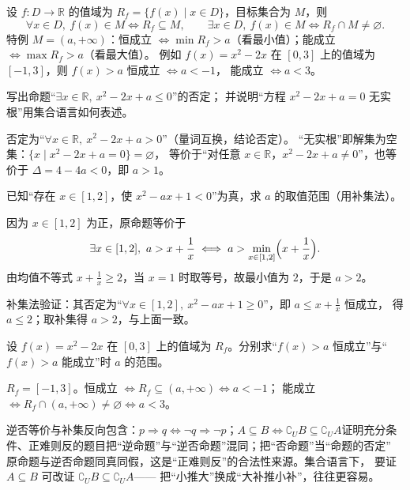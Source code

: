 \begin{explore}
设 $f:D\to\mathbb{R}$ 的值域为 $R_f=\{f(x)\mid x\in D\}$，目标集合为 $M$，则
\[
  \forall x\in D,\ f(x)\in M \iff R_f\subseteq M,\qquad
  \exists x\in D,\ f(x)\in M \iff R_f\cap M\neq\varnothing.
\]
特例 $M=(a,+\infty)$：恒成立 $\iff\min R_f>a$（看最小值）；能成立 $\iff\max R_f>a$（看最大值）。
例如 $f(x)=x^2-2x$ 在 $[0,3]$ 上的值域为 $[-1,3]$，则 $f(x)>a$ 恒成立 $\iff a<-1$，
能成立 $\iff a<3$。

\begin{example}
写出命题“$\exists x\in\mathbb{R},\ x^2-2x+a\leq0$”的否定；
并说明“方程 $x^2-2x+a=0$ 无实根”用集合语言如何表述。
\end{example}
\begin{solution}
否定为“$\forall x\in\mathbb{R},\ x^2-2x+a>0$”（量词互换，结论否定）。
“无实根”即解集为空集：$\{x\mid x^2-2x+a=0\}=\varnothing$，
等价于“对任意 $x\in\mathbb{R}$，$x^2-2x+a\neq0$”，也等价于 $\Delta=4-4a<0$，即 $a>1$。
\end{solution}

\begin{example}
已知“存在 $x\in[1,2]$，使 $x^2-ax+1<0$”为真，求 $a$ 的取值范围（用补集法）。
\end{example}
\begin{solution}
因为 $x\in[1,2]$ 为正，原命题等价于
\[
  \exists x\in[1,2],\ a>x+\frac1x
  \iff a>\min_{x\in[1,2]}\Bigl(x+\frac1x\Bigr).
\]
由均值不等式 $x+\frac1x\geq2$，当 $x=1$ 时取等号，故最小值为 $2$，于是 $a>2$。

补集法验证：其否定为“$\forall x\in[1,2],\ x^2-ax+1\geq0$”，即 $a\leq x+\frac1x$ 恒成立，
得 $a\leq2$；取补集得 $a>2$，与上面一致。
\end{solution}

\begin{problem}
设 $f(x)=x^2-2x$ 在 $[0,3]$ 上的值域为 $R_f$。分别求“$f(x)>a$ 恒成立”与“$f(x)>a$ 能成立”时 $a$ 的范围。
\end{problem}
\begin{solution}
$R_f=[-1,3]$。恒成立 $\iff R_f\subseteq(a,+\infty)\iff a<-1$；
能成立 $\iff R_f\cap(a,+\infty)\neq\varnothing\iff a<3$。
\end{solution}

\begin{conccard}[二级]{逆否等价与补集反向包含：$p\Rightarrow q\iff\neg q\Rightarrow\neg p$；$A\subseteq B\iff\complement_U B\subseteq\complement_U A$}{证明充分条件、正难则反的题目}{把“逆命题”与“逆否命题”混同；把“否命题”当“命题的否定”}
原命题与逆否命题同真同假，这是“正难则反”的合法性来源。集合语言下，
要证 $A\subseteq B$ 可改证 $\complement_U B\subseteq\complement_U A$——
把“小推大”换成“大补推小补”，往往更容易。
\end{conccard}


\end{explore}
